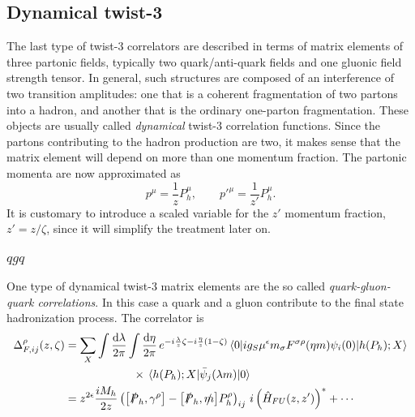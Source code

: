 \subsection{Dynamical twist-3}
The last type of twist-3 correlators are described in terms of matrix elements of three partonic fields, typically two quark/anti-quark fields and one gluonic field strength tensor. In general, such structures are composed of an interference of two transition amplitudes: one that is a coherent fragmentation of two partons into a hadron, and another that is the ordinary one-parton fragmentation. These objects are usually called \textit{dynamical} twist-3 correlation functions. Since the partons contributing to the hadron production are two, it makes sense that the matrix element will depend on more than one momentum fraction. The partonic momenta are now approximated as
\begin{equation}
    p^\mu = \frac{1}{z}P_h^\mu,\qquad p'^\mu = \frac{1}{z'}P_h^\mu.
\end{equation}
It is customary to introduce a scaled variable for the $z'$ momentum fraction, $z'= z/\zeta$, since it will simplify the treatment later on.
\subsubsection*{$qgq$} 
One type of dynamical twist-3 matrix elements are the so called \textit{quark-gluon-quark correlations}. In this case a quark and a gluon contribute to the final state hadronization process. The correlator is
\begin{equation}
    \begin{aligned}
        \Delta^\rho_{F,ij}(z,\zeta)&= \sum_X\int\frac{\dd \lambda}{2\pi}\int\frac{\dd \eta}{2\pi} \,e^{-i\frac{\lambda }{z}\zeta-i\frac{\eta}{z}\left(1-\zeta\right)}\mel{0}{ig_S \mu^\epsilon m_\sigma F^{\sigma \rho}(\eta m)\psi_i(0)}{h(P_h);X}\\
        &\qquad \qquad \qquad \times\mel{h(P_h);X}{\bar \psi_j(\lambda m)}{0}\\
        &= z^{2\epsilon}\frac{iM_h}{2z}\left(\comm{\slashed{P}_h}{\gamma^\rho}-\comm{\slashed{P}_h}{\slashed{m}}P_h^\rho\right)_{ij}\,i\left(\hat H_{FU}(z,z')\right)^*+\cdots
        \end{aligned}
\end{equation}
